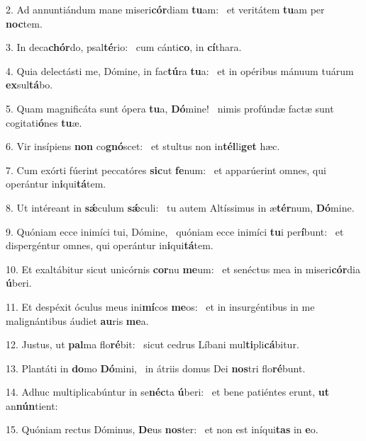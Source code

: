 2. Ad annuntiándum mane miseri\textbf{cór}diam \textbf{tu}am: \ast\  et veritátem \textbf{tu}am per \textbf{noc}tem.\

3. In deca\textbf{chór}do, psal\textbf{té}rio: \ast\  cum cánti\textbf{co}, in \textbf{cí}thara.\

4. Quia delectásti me, Dómine, in fac\textbf{tú}ra \textbf{tu}a: \ast\  et in opéribus mánuum tuárum \textbf{ex}sul\textbf{tá}bo.\

5. Quam magnificáta sunt ópera \textbf{tu}a, \textbf{Dó}mine! \ast\  nimis profúndæ factæ sunt cogitati\textbf{ó}nes \textbf{tu}æ.\

6. Vir insípiens \textbf{non} co\textbf{gnó}scet: \ast\  et stultus non in\textbf{tél}li\textbf{get} hæc.\

7. Cum exórti fúerint peccatóres \textbf{sic}ut \textbf{fe}num: \ast\  et apparúerint omnes, qui operántur in\textbf{i}qui\textbf{tá}tem.\

8. Ut intéreant in \textbf{sǽ}culum \textbf{sǽ}culi: \ast\  tu autem Altíssimus in æ\textbf{tér}num, \textbf{Dó}mine.\

9. Quóniam ecce inimíci tui, Dómine, \dag\  quóniam ecce inimíci \textbf{tu}i per\textbf{í}bunt: \ast\  et dispergéntur omnes, qui operántur in\textbf{i}qui\textbf{tá}tem.\

10. Et exaltábitur sicut unicórnis \textbf{cor}nu \textbf{me}um: \ast\  et senéctus mea in miseri\textbf{cór}dia \textbf{ú}beri.\

11. Et despéxit óculus meus ini\textbf{mí}cos \textbf{me}os: \ast\  et in insurgéntibus in me malignántibus áudiet \textbf{au}ris \textbf{me}a.\

12. Justus, ut \textbf{pal}ma flo\textbf{ré}bit: \ast\  sicut cedrus Líbani mul\textbf{ti}pli\textbf{cá}bitur.\

13. Plantáti in \textbf{do}mo \textbf{Dó}mini, \ast\  in átriis domus Dei \textbf{nos}tri flo\textbf{ré}bunt.\

14. Adhuc multiplicabúntur in se\textbf{néc}ta \textbf{ú}beri: \ast\  et bene patiéntes erunt, \textbf{ut} an\textbf{nún}tient:\

15. Quóniam rectus Dóminus, \textbf{De}us \textbf{nos}ter: \ast\  et non est iníqui\textbf{tas} in \textbf{e}o.\

